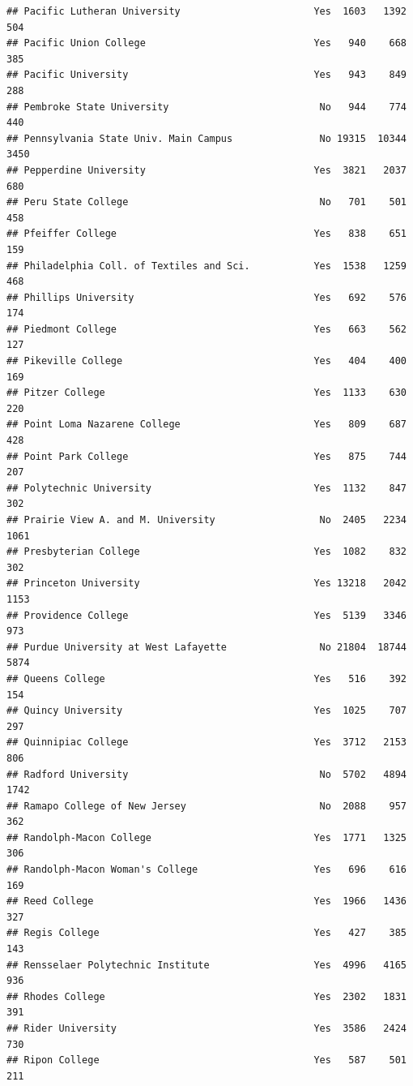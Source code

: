\documentclass[
]{article}
\begin{document}
\begin{verbatim}
## Pacific Lutheran University                       Yes  1603   1392    504
## Pacific Union College                             Yes   940    668    385
## Pacific University                                Yes   943    849    288
## Pembroke State University                          No   944    774    440
## Pennsylvania State Univ. Main Campus               No 19315  10344   3450
## Pepperdine University                             Yes  3821   2037    680
## Peru State College                                 No   701    501    458
## Pfeiffer College                                  Yes   838    651    159
## Philadelphia Coll. of Textiles and Sci.           Yes  1538   1259    468
## Phillips University                               Yes   692    576    174
## Piedmont College                                  Yes   663    562    127
## Pikeville College                                 Yes   404    400    169
## Pitzer College                                    Yes  1133    630    220
## Point Loma Nazarene College                       Yes   809    687    428
## Point Park College                                Yes   875    744    207
## Polytechnic University                            Yes  1132    847    302
## Prairie View A. and M. University                  No  2405   2234   1061
## Presbyterian College                              Yes  1082    832    302
## Princeton University                              Yes 13218   2042   1153
## Providence College                                Yes  5139   3346    973
## Purdue University at West Lafayette                No 21804  18744   5874
## Queens College                                    Yes   516    392    154
## Quincy University                                 Yes  1025    707    297
## Quinnipiac College                                Yes  3712   2153    806
## Radford University                                 No  5702   4894   1742
## Ramapo College of New Jersey                       No  2088    957    362
## Randolph-Macon College                            Yes  1771   1325    306
## Randolph-Macon Woman's College                    Yes   696    616    169
## Reed College                                      Yes  1966   1436    327
## Regis College                                     Yes   427    385    143
## Rensselaer Polytechnic Institute                  Yes  4996   4165    936
## Rhodes College                                    Yes  2302   1831    391
## Rider University                                  Yes  3586   2424    730
## Ripon College                                     Yes   587    501    211

\end{verbatim}
\end{document}

